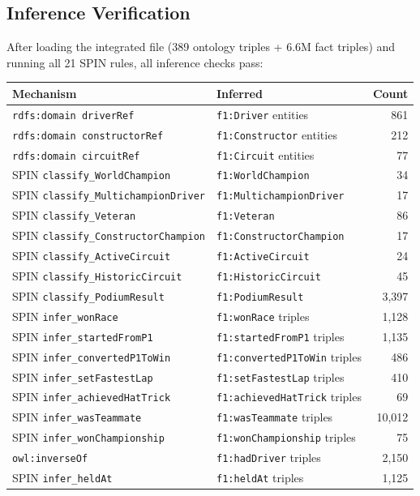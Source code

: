 \documentclass[12pt,a4paper]{article}
\begin{document}
\subsection{Inference Verification}

After loading the integrated file (389 ontology triples + 6.6M fact triples) and
running all 21 SPIN rules, all inference checks pass:

\begin{center}
\begin{tabular}{@{}llr@{}}
\toprule
\textbf{Mechanism} & \textbf{Inferred} & \textbf{Count} \\
\midrule
\texttt{rdfs:domain driverRef} & \texttt{f1:Driver} entities & 861 \\
\texttt{rdfs:domain constructorRef} & \texttt{f1:Constructor} entities & 212 \\
\texttt{rdfs:domain circuitRef} & \texttt{f1:Circuit} entities & 77 \\
SPIN \texttt{classify\_WorldChampion} & \texttt{f1:WorldChampion} & 34 \\
SPIN \texttt{classify\_MultichampionDriver} & \texttt{f1:MultichampionDriver} & 17 \\
SPIN \texttt{classify\_Veteran} & \texttt{f1:Veteran} & 86 \\
SPIN \texttt{classify\_ConstructorChampion} & \texttt{f1:ConstructorChampion} & 17 \\
SPIN \texttt{classify\_ActiveCircuit} & \texttt{f1:ActiveCircuit} & 24 \\
SPIN \texttt{classify\_HistoricCircuit} & \texttt{f1:HistoricCircuit} & 45 \\
SPIN \texttt{classify\_PodiumResult} & \texttt{f1:PodiumResult} & 3{,}397 \\
SPIN \texttt{infer\_wonRace} & \texttt{f1:wonRace} triples & 1{,}128 \\
SPIN \texttt{infer\_startedFromP1} & \texttt{f1:startedFromP1} triples & 1{,}135 \\
SPIN \texttt{infer\_convertedP1ToWin} & \texttt{f1:convertedP1ToWin} triples & 486 \\
SPIN \texttt{infer\_setFastestLap} & \texttt{f1:setFastestLap} triples & 410 \\
SPIN \texttt{infer\_achievedHatTrick} & \texttt{f1:achievedHatTrick} triples & 69 \\
SPIN \texttt{infer\_wasTeammate} & \texttt{f1:wasTeammate} triples & 10{,}012 \\
SPIN \texttt{infer\_wonChampionship} & \texttt{f1:wonChampionship} triples & 75 \\
\texttt{owl:inverseOf} & \texttt{f1:hadDriver} triples & 2{,}150 \\
SPIN \texttt{infer\_heldAt} & \texttt{f1:heldAt} triples & 1{,}125 \\
\bottomrule
\end{tabular}
\end{center}
\end{document}

